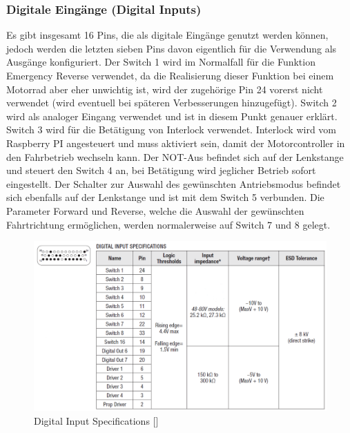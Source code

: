\subsubsection{Digitale Eingänge (Digital Inputs)}
\label{Digitale_Eingaenge}
Es gibt insgesamt 16 Pins, die als digitale Eingänge genutzt werden können, jedoch werden die letzten sieben Pins davon eigentlich für die Verwendung als Ausgänge konfiguriert. Der Switch 1 wird im Normalfall für die Funktion \glqq Emergency Reverse\grqq{} verwendet, da die Realisierung dieser Funktion bei einem Motorrad aber eher unwichtig ist, wird der zugehörige Pin 24 vorerst nicht verwendet (wird eventuell bei späteren Verbesserungen hinzugefügt). Switch 2 wird als analoger Eingang verwendet und ist in diesem Punkt genauer erklärt. Switch 3 wird für die Betätigung von Interlock verwendet. Interlock wird vom Raspberry PI angesteuert und muss aktiviert sein, damit der Motorcontroller in den Fahrbetrieb wechseln kann. Der NOT-Aus befindet sich auf der Lenkstange und steuert den Switch 4 an, bei Betätigung wird jeglicher Betrieb sofort eingestellt. Der Schalter zur Auswahl des gewünschten Antriebsmodus befindet sich ebenfalls auf der Lenkstange und ist mit dem Switch 5 verbunden. Die Parameter \glqq Forward\grqq{} und \glqq Reverse\grqq{}, welche die Auswahl der gewünschten Fahrtrichtung ermöglichen, werden normalerweise auf Switch 7 und 8 gelegt.

\begin{figure}[H]
	\begin{center}
		\includegraphics[width=\textwidth]{figures/antrieb/Digital_Input_Specifications.png}
		\caption{Digital Input Specifications [\cite{Manual}]}
	\end{center}
\end{figure}




